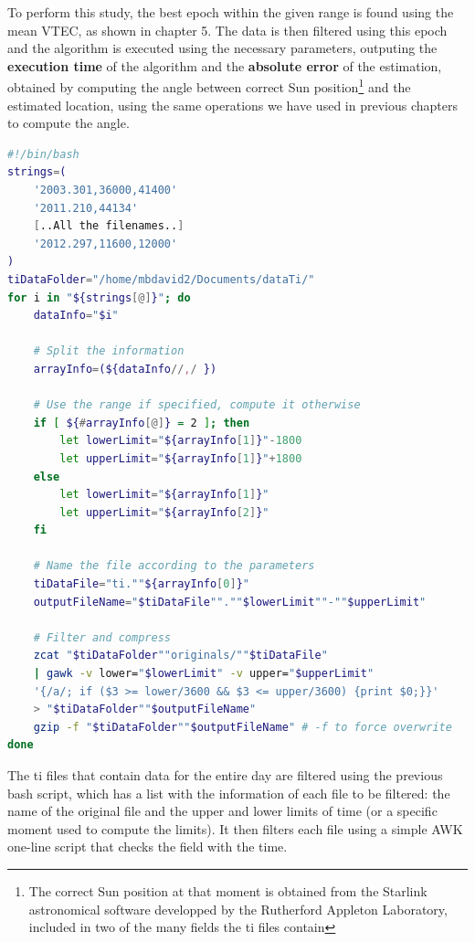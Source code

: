 To perform this study, the best epoch within the given range is found using the mean VTEC, as shown in chapter 5. The data is then filtered using this epoch and the algorithm is executed using the necessary parameters, outputing the \textbf{execution time} of the algorithm and the \textbf{absolute error} of the estimation, obtained by computing the angle between correct Sun position\footnote{The correct Sun position at that moment is obtained from the Starlink astronomical software developped by the Rutherford Appleton Laboratory, included in two of the many fields the ti files contain} and the estimated location, using the same operations we have used in previous chapters to compute the angle. 

\begin{minipage}{\linewidth}
	\begin{lstlisting}[language=Bash, caption=Filtering the ti file]
#!/bin/bash	
strings=(
	'2003.301,36000,41400'
	'2011.210,44134'
	[..All the filenames..] 
	'2012.297,11600,12000'
)
tiDataFolder="/home/mbdavid2/Documents/dataTi/"
for i in "${strings[@]}"; do
	dataInfo="$i"
	
	# Split the information
	arrayInfo=(${dataInfo//,/ })
	
	# Use the range if specified, compute it otherwise
	if [ ${#arrayInfo[@]} = 2 ]; then
		let lowerLimit="${arrayInfo[1]}"-1800
		let upperLimit="${arrayInfo[1]}"+1800
	else
		let lowerLimit="${arrayInfo[1]}"
		let upperLimit="${arrayInfo[2]}"
	fi
	
	# Name the file according to the parameters
	tiDataFile="ti.""${arrayInfo[0]}"
	outputFileName="$tiDataFile"".""$lowerLimit""-""$upperLimit"
	
	# Filter and compress
	zcat "$tiDataFolder""originals/""$tiDataFile" 
	| gawk -v lower="$lowerLimit" -v upper="$upperLimit" 
	'{/a/; if ($3 >= lower/3600 && $3 <= upper/3600) {print $0;}}' 
	> "$tiDataFolder""$outputFileName"
	gzip -f "$tiDataFolder""$outputFileName" # -f to force overwrite
done\end{lstlisting}
\end{minipage}

The ti files that contain data for the entire day are filtered using the previous bash script, which has a list with the information of each file to be filtered: the name of the original file and the upper and lower limits of time (or a specific moment used to compute the limits). It then filters each file using a simple AWK one-line script that checks the field with the time.

